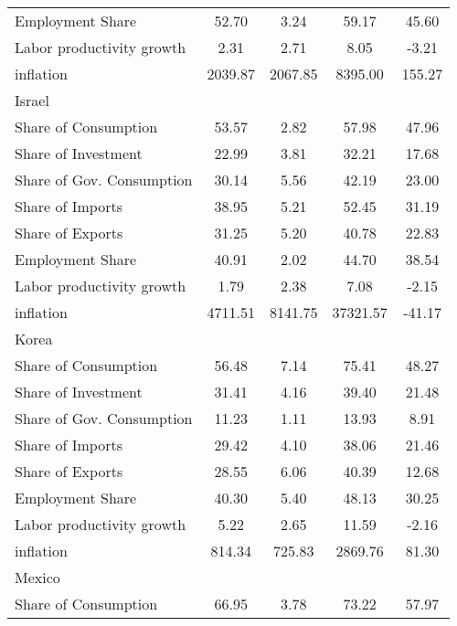 {\begin{longtable}{l*{1}{cccc}}
Employment Share    &       52.70&        3.24&       59.17&       45.60\\
Labor productivity growth&        2.31&        2.71&        8.05&       -3.21\\
inflation           &     2039.87&     2067.85&     8395.00&      155.27\\
Israel              &            &            &            &            \\
Share of Consumption&       53.57&        2.82&       57.98&       47.96\\
Share of Investment &       22.99&        3.81&       32.21&       17.68\\
Share of Gov. Consumption&       30.14&        5.56&       42.19&       23.00\\
Share of Imports    &       38.95&        5.21&       52.45&       31.19\\
Share of Exports    &       31.25&        5.20&       40.78&       22.83\\
Employment Share    &       40.91&        2.02&       44.70&       38.54\\
Labor productivity growth&        1.79&        2.38&        7.08&       -2.15\\
inflation           &     4711.51&     8141.75&    37321.57&      -41.17\\
Korea               &            &            &            &            \\
Share of Consumption&       56.48&        7.14&       75.41&       48.27\\
Share of Investment &       31.41&        4.16&       39.40&       21.48\\
Share of Gov. Consumption&       11.23&        1.11&       13.93&        8.91\\
Share of Imports    &       29.42&        4.10&       38.06&       21.46\\
Share of Exports    &       28.55&        6.06&       40.39&       12.68\\
Employment Share    &       40.30&        5.40&       48.13&       30.25\\
Labor productivity growth&        5.22&        2.65&       11.59&       -2.16\\
inflation           &      814.34&      725.83&     2869.76&       81.30\\
Mexico              &            &            &            &            \\
Share of Consumption&       66.95&        3.78&       73.22&       57.97\\

\end{longtable}}
